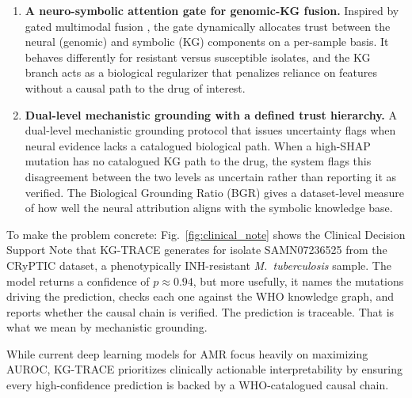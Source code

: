 \documentclass[conference]{IEEEtran}
\begin{document}
\begin{enumerate}
  \item \textbf{A neuro-symbolic attention gate for genomic-KG fusion.} Inspired by gated multimodal fusion \cite{vilbert,cheerla2019}, the gate dynamically allocates trust between the neural (genomic) and symbolic (KG) components on a per-sample basis. It behaves differently for resistant versus susceptible isolates, and the KG branch acts as a biological regularizer that penalizes reliance on features without a causal path to the drug of interest.

  \item \textbf{Dual-level mechanistic grounding with a defined trust hierarchy.} A dual-level mechanistic grounding protocol that issues uncertainty flags when neural evidence lacks a catalogued biological path. When a high-SHAP mutation has no catalogued KG path to the drug, the system flags this disagreement between the two levels as uncertain rather than reporting it as verified. The Biological Grounding Ratio (BGR) gives a dataset-level measure of how well the neural attribution aligns with the symbolic knowledge base.
\end{enumerate}

To make the problem concrete: Fig.~\ref{fig:clinical_note} shows the Clinical Decision Support Note that KG-TRACE generates for isolate SAMN07236525 from the CRyPTIC dataset, a phenotypically INH-resistant \textit{M.~tuberculosis} sample. The model returns a confidence of $p\approx 0.94$, but more usefully, it names the mutations driving the prediction, checks each one against the WHO knowledge graph, and reports whether the causal chain is verified. The prediction is traceable. That is what we mean by mechanistic grounding.

While current deep learning models for AMR focus heavily on maximizing AUROC, KG-TRACE prioritizes clinically actionable interpretability by ensuring every high-confidence prediction is backed by a WHO-catalogued causal chain.
\end{document}
